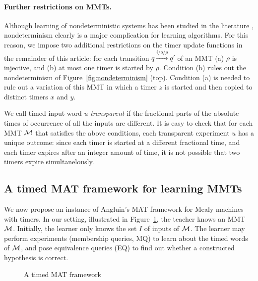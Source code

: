 \paragraph{Further restrictions on MMTs.}
Although learning of nondeterministic systems has been studied in the literature \cite{VolpatoT14},
nondeterminism clearly is a major complication for learning algorithms. For this reason, we impose two additional
restrictions on the timer update functions in the remainder of this article:
for each transition $q \xrightarrow{i/o/\rho} q'$
of an MMT (a) $\rho$ is injective, and (b) at most one timer is started by $\rho$.
Condition (b) rules out the nondeterminism of Figure~\ref{fig:nondeterminism} (top).
Condition (a) is needed to rule out a variation of this MMT in which a timer $z$ is started and then copied to distinct
timers $x$ and $y$.

We call timed input word $u$ \emph{transparent} if the fractional parts of the absolute times of occurrence of
all the inputs are different.
It is easy to check that for each MMT ${\mathcal M}$ that satisfies the above conditions,
each transparent experiment $u$ has a unique outcome: since each timer is started at a different fractional time,
and each timer expires after an integer amount of time, it is not possible that two timers expire simultanelously.

\subsection{A timed MAT framework for learning MMTs}
We now propose an instance of Angluin's MAT framework for Mealy machines with timers.
In our setting, illustrated in Figure~\ref{fig timed MAT}, the teacher knows an MMT ${\mathcal M}$.
Initially, the learner only knows the set $I$ of inputs of ${\mathcal M}$.
The learner may perform experiments (membership queries, MQ) to learn about the
timed words of ${\mathcal M}$, and  pose equivalence queries (EQ) to find out whether a constructed hypothesis is correct.

\begin{figure}[h]
\begin{center}
\end{center} 
\caption{A timed MAT framework}
\label{fig timed MAT}
\end{figure}

